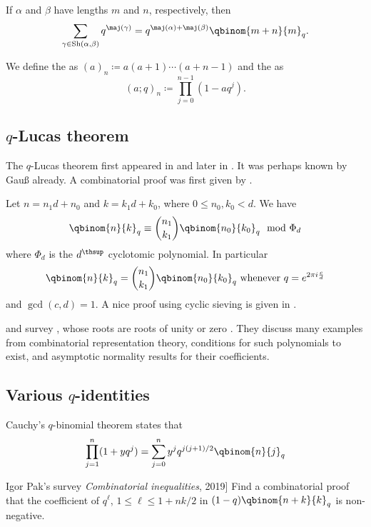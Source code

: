 \begin{theorem}
If \(\alpha\) and \(\beta\) have lengths \(m\) and \(n\), respectively, then
\[
  \sum_{\gamma \in \operatorname{Sh}(\alpha,\beta)} q^{\maj(\gamma)}
  =
  q^{\maj(\alpha)+\maj(\beta)}
  \qbinom{m+n}{m}_q.
\]
\end{theorem}

We define the \label{pochhammerSymbol} as
$(a)_n \coloneqq a(a+1)\dotsm (a+n-1)$ and the
\label{qPochhammerSymbol} as
\[
(a;q)_n \coloneqq \prod_{j=0}^{n-1}(1-a q^j).
\]



\subsection[prelimQanalogsQLucas]{$q$-Lucas theorem}


The $q$-Lucas theorem first appeared in \cite[Eq. (1.2.4)]{Olive1965}
and later in \cite[Prop. 2.2]{Desarmenien1982}.
It was perhaps known by Gauß already.
A combinatorial proof was first given by  \cite{Strehl1981}.

Let $n=n_1 d + n_0$ and $k=k_1 d + k_0$, where $0\leq n_0, k_0 < d$.
We have
\[
\qbinom{n}{k}_q \equiv
\binom{n_1}{k_1}
\qbinom{n_0}{k_0}_q  \mod \Phi_d
\]
where $\Phi_d$ is the $d^\thsup$ cyclotomic polynomial. In particular
\[
\qbinom{n}{k}_q =
\binom{n_1}{k_1}
\qbinom{n_0}{k_0}_q \text{ whenever } q=e^{2\pi i \frac{c}{d}}
\]
and $\gcd(c,d)=1$.
A nice proof using cyclic sieving is given in \cite{Sagan1992}.

 and  survey
\label{cyclotomicGeneratingFunction},
whose roots are roots of unity or
zero \cite{BilleySwanson2023x}.  They discuss many examples from combinatorial
representation theory, conditions for such polynomials to exist, and
asymptotic normality results for their coefficients.



\subsection[prelimQidentities]{Various $q$-identities}

Cauchy's $q$-binomial theorem states that
\[
\prod_{j=1}^n (1+yq^j) = \sum_{j=0}^n y^j q^{j(j+1)/2} \qbinom{n}{j}_q
\]

\begin{problem}[See background in \name[I. Pak]{Igor Pak}'s survey
\emph{Combinatorial inequalities}, 2019]
Find a combinatorial proof that the coefficient of $q^\ell$, $1\leq \ell \leq 1 + n k/2$
in $(1-q)\qbinom{n+k}{k}_q$ is non-negative.
\end{problem}

